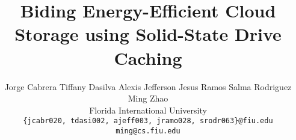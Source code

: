 \documentclass[letterpaper,twocolumn,10pt]{article}
\title{\Large \bf Biding Energy-Efficient Cloud Storage using Solid-State Drive
  Caching}
\author{
  \qquad
  {\rm Jorge Cabrera}
  \qquad
  {\rm Tiffany Dasilva}
  \qquad
  {\rm Alexis Jefferson}
  \qquad
  {\rm Jesus Ramos}
  \qquad
  {\rm Salma Rodriguez}
  \\
  \qquad
  {\rm Ming Zhao}
  \\
  Florida International University
  \\
  {\rm \texttt{\{jcabr020, tdasi002, ajeff003, jramo028, srodr063\}@fiu.edu}}
  \\
  {\rm \texttt{ming@cs.fiu.edu}}
}
\date{}
\begin{document}
\maketitle








% 



{
  \footnotesize
  
  
}
\end{document}
